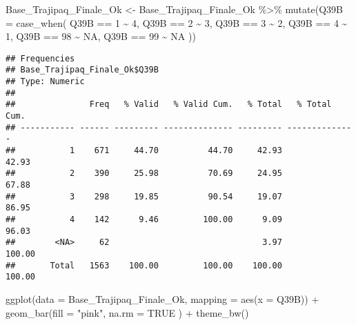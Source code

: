 \documentclass[
]{article}
\newenvironment{Shaded}{\begin{snugshade}}{\end{snugshade}}
\newcommand{\AttributeTok}[1]{\textcolor[rgb]{0.77,0.63,0.00}{#1}}
\newcommand{\ConstantTok}[1]{\textcolor[rgb]{0.00,0.00,0.00}{#1}}
\newcommand{\DecValTok}[1]{\textcolor[rgb]{0.00,0.00,0.81}{#1}}
\newcommand{\FunctionTok}[1]{\textcolor[rgb]{0.00,0.00,0.00}{#1}}
\newcommand{\NormalTok}[1]{#1}
\newcommand{\OtherTok}[1]{\textcolor[rgb]{0.56,0.35,0.01}{#1}}
\newcommand{\SpecialCharTok}[1]{\textcolor[rgb]{0.00,0.00,0.00}{#1}}
\newcommand{\StringTok}[1]{\textcolor[rgb]{0.31,0.60,0.02}{#1}}
\begin{document}
\begin{Shaded}
\begin{Highlighting}[]
\NormalTok{Base\_Trajipaq\_Finale\_Ok }\OtherTok{\textless{}{-}}
\NormalTok{  Base\_Trajipaq\_Finale\_Ok }\SpecialCharTok{\%\textgreater{}\%}
  \FunctionTok{mutate}\NormalTok{(}\AttributeTok{Q39B =} \FunctionTok{case\_when}\NormalTok{(}
\NormalTok{    Q39B }\SpecialCharTok{==} \DecValTok{1} \SpecialCharTok{\textasciitilde{}} \DecValTok{4}\NormalTok{,}
\NormalTok{    Q39B }\SpecialCharTok{==} \DecValTok{2} \SpecialCharTok{\textasciitilde{}} \DecValTok{3}\NormalTok{,}
\NormalTok{    Q39B }\SpecialCharTok{==} \DecValTok{3} \SpecialCharTok{\textasciitilde{}} \DecValTok{2}\NormalTok{,}
\NormalTok{    Q39B }\SpecialCharTok{==} \DecValTok{4} \SpecialCharTok{\textasciitilde{}} \DecValTok{1}\NormalTok{,}
\NormalTok{    Q39B }\SpecialCharTok{==} \DecValTok{98} \SpecialCharTok{\textasciitilde{}} \ConstantTok{NA}\NormalTok{,}
\NormalTok{    Q39B }\SpecialCharTok{==} \DecValTok{99} \SpecialCharTok{\textasciitilde{}} \ConstantTok{NA}
\NormalTok{  ))}
\end{Highlighting}
\end{Shaded}

\begin{Shaded}
\end{Shaded}

\begin{verbatim}
## Frequencies  
## Base_Trajipaq_Finale_Ok$Q39B  
## Type: Numeric  
## 
##               Freq   % Valid   % Valid Cum.   % Total   % Total Cum.
## ----------- ------ --------- -------------- --------- --------------
##           1    671     44.70          44.70     42.93          42.93
##           2    390     25.98          70.69     24.95          67.88
##           3    298     19.85          90.54     19.07          86.95
##           4    142      9.46         100.00      9.09          96.03
##        <NA>     62                               3.97         100.00
##       Total   1563    100.00         100.00    100.00         100.00
\end{verbatim}

\begin{Shaded}
\begin{Highlighting}[]
\FunctionTok{ggplot}\NormalTok{(}\AttributeTok{data =}\NormalTok{ Base\_Trajipaq\_Finale\_Ok, }\AttributeTok{mapping =} \FunctionTok{aes}\NormalTok{(}\AttributeTok{x =}\NormalTok{ Q39B)) }\SpecialCharTok{+}
  \FunctionTok{geom\_bar}\NormalTok{(}\AttributeTok{fill =} \StringTok{"pink"}\NormalTok{,}
           \AttributeTok{na.rm =} \ConstantTok{TRUE}
\NormalTok{           ) }\SpecialCharTok{+}
  \FunctionTok{theme\_bw}\NormalTok{()}
\end{Highlighting}
\end{Shaded}
\end{document}
